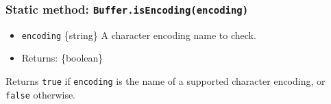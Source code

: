 \begin{Shaded}
\begin{Highlighting}[]
\NormalTok{ \{ }\NormalTok{ \} }\OperatorTok{=} \NormalTok{(}\NormalTok{)}\OperatorTok{;}

\NormalTok{(}\NormalTok{(}\NormalTok{))}\OperatorTok{;} 
\NormalTok{(}\NormalTok{(}\NormalTok{))}\OperatorTok{;} 
\NormalTok{(}\NormalTok{)}\OperatorTok{;} 
\NormalTok{([])}\OperatorTok{;} 
\NormalTok{(} \NormalTok{(}\NormalTok{))}\OperatorTok{;} 
\end{Highlighting}
\end{Shaded}

\subsubsection{\texorpdfstring{Static method:
\texttt{Buffer.isEncoding(encoding)}}{Static method: Buffer.isEncoding(encoding)}}\label{static-method-buffer.isencodingencoding}

\begin{itemize}
\tightlist
\item
  \texttt{encoding} \{string\} A character encoding name to check.
\item
  Returns: \{boolean\}
\end{itemize}

Returns \texttt{true} if \texttt{encoding} is the name of a supported
character encoding, or \texttt{false} otherwise.

